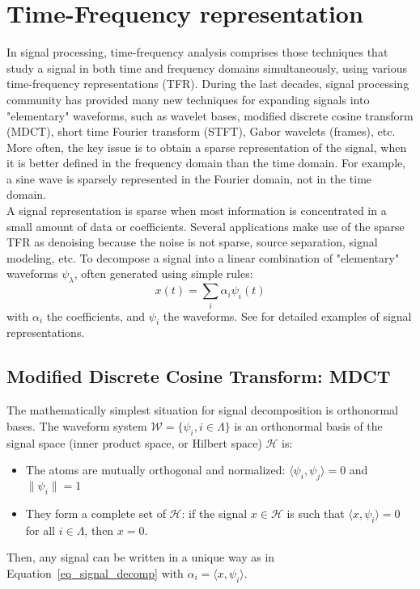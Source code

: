 \section{Time-Frequency representation}
\label{section:TF}
In signal processing, time-frequency analysis comprises those techniques that study a signal in both time and frequency domains simultaneously, using various time-frequency representations (TFR). During the last decades, signal processing community has provided many new techniques for expanding signals into "elementary" waveforms, such as wavelet bases, modified discrete cosine transform (MDCT), short time Fourier transform (STFT), Gabor wavelets (frames), etc. More often, the key issue is to obtain a sparse representation of the signal, when it is better defined in the frequency domain than the time domain. For example, a sine wave is sparsely represented in the Fourier domain, not in the time domain.\\

A signal representation is sparse when most information is concentrated in a small amount of data or coefficients. Several applications make use of the sparse TFR as denoising because the noise is not sparse, source separation, signal modeling, etc. To decompose a signal into a linear combination of "elementary" waveforms $\psi_{\lambda}$, often generated using simple rules:
\begin{equation}\label{eq_signal_decomp}
x(t) = \sum_i\alpha_i\psi_i(t)
\end{equation}
with $\alpha_i$ the coefficients, and $\psi_i$ the waveforms. See \cite{mallat2008wavelet,hlawatsch1992linear,wickerhauser1994adapted} for detailed examples of signal representations.\\

\subsection{Modified Discrete Cosine Transform: MDCT}
The mathematically simplest situation for signal decomposition is orthonormal bases. The waveform system $\mathcal{W}=\{\psi_i, i \in\Lambda\}$ is an orthonormal basis of the signal space (inner product space, or Hilbert space) $\mathcal{H}$ is:
\begin{itemize}
\item The atoms are mutually orthogonal and normalized: $\langle\psi_i,\psi_j\rangle = 0$ and $\|\psi_i\|=1$
\item They form a complete set of $\mathcal{H}$: if the signal $x\in\mathcal{H}$ is such that $\langle x,\psi_i\rangle=0$ for all $i\in\Lambda$, then $x=0$.
\end{itemize}
Then, any signal can be written in a unique way as in Equation~\ref{eq_signal_decomp} with $\alpha_i=\langle x,\psi_i\rangle$.\\

